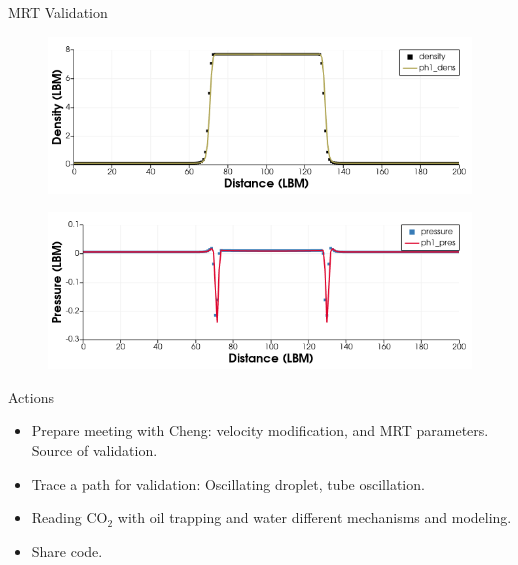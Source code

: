 \documentclass[8pt]{beamer}
\begin{document}
	\begin{frame}{MRT Validation}
		\begin{figure}
			\centering
			\includegraphics[scale=0.4]{pics/MRTValDen.png}
		\end{figure}
		\begin{figure}
			\centering
			\includegraphics[scale=0.4]{pics/MRTValPres.png}
		\end{figure}
	
	\end{frame}
	\begin{frame}{Actions}
		\begin{itemize}
			\item Prepare meeting with Cheng: velocity modification, and MRT parameters. Source of validation.
			\item Trace a path for validation: Oscillating droplet, tube oscillation. 
			\item Reading CO$_2$ with oil trapping and water different mechanisms and modeling.
			\item Share code.
			
		\end{itemize}
	\end{frame}
	
	
	
\end{document}
